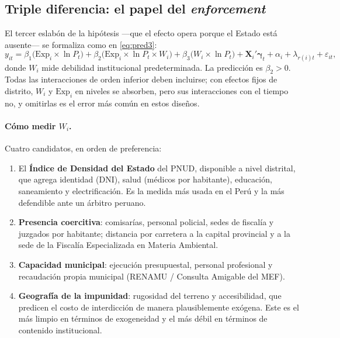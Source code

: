 \documentclass[11pt,a4paper]{article}
\newcommand{\Exp}{\mathrm{Exp}}
\begin{document}
\subsection{Triple diferencia: el papel del \emph{enforcement}}

El tercer eslabón de la hipótesis ---que el efecto opera porque el Estado está ausente--- se formaliza como en \eqref{eq:pred3}:
\begin{equation}
y_{it} = \beta_1 \bigl(\Exp_i \times \ln P_t\bigr) + \beta_2 \bigl(\Exp_i \times \ln P_t \times W_i\bigr) + \beta_3\bigl(W_i \times \ln P_t\bigr) + \mathbf{X}_i'\boldsymbol{\gamma}_t + \alpha_i + \lambda_{r(i)t} + \varepsilon_{it},
\label{eq:ddd}
\end{equation}
donde $W_i$ mide debilidad institucional predeterminada. La predicción es $\beta_2 > 0$. Todas las interacciones de orden inferior deben incluirse; con efectos fijos de distrito, $W_i$ y $\Exp_i$ en niveles se absorben, pero sus interacciones con el tiempo no, y omitirlas es el error más común en estos diseños.

\paragraph{Cómo medir $W_i$.} Cuatro candidatos, en orden de preferencia:
\begin{enumerate}[leftmargin=1.6em,itemsep=1pt]
\item El \textbf{Índice de Densidad del Estado} del PNUD, disponible a nivel distrital, que agrega identidad (DNI), salud (médicos por habitante), educación, saneamiento y electrificación. Es la medida más usada en el Perú y la más defendible ante un árbitro peruano.
\item \textbf{Presencia coercitiva}: comisarías, personal policial, sedes de fiscalía y juzgados por habitante; distancia por carretera a la capital provincial y a la sede de la Fiscalía Especializada en Materia Ambiental.
\item \textbf{Capacidad municipal}: ejecución presupuestal, personal profesional y recaudación propia municipal (RENAMU / Consulta Amigable del MEF).
\item \textbf{Geografía de la impunidad}: rugosidad del terreno y accesibilidad, que predicen el costo de interdicción de manera plausiblemente exógena. Este es el más limpio en términos de exogeneidad y el más débil en términos de contenido institucional.
\end{enumerate}
\end{document}
